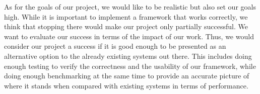 \documentclass[10pt, conference, compsocconf]{IEEEtran}
\begin{document}
As for the goals of our project, we would like to be realistic but also set our goals high. While it is important to implement a framework that works correctly, we think that stopping there would make our project only partially successful. We want to evaluate our success in terms of the impact of our work. Thus, we would consider our project a success if it is good enough to be presented as an alternative option to the already existing systems out there. This includes doing enough testing to verify the correctness and  the usability of our framework, while doing enough benchmarking at the same time to provide an accurate picture of where it stands when compared with existing systems in terms of performance.

%
%



%
%
\end{document}

